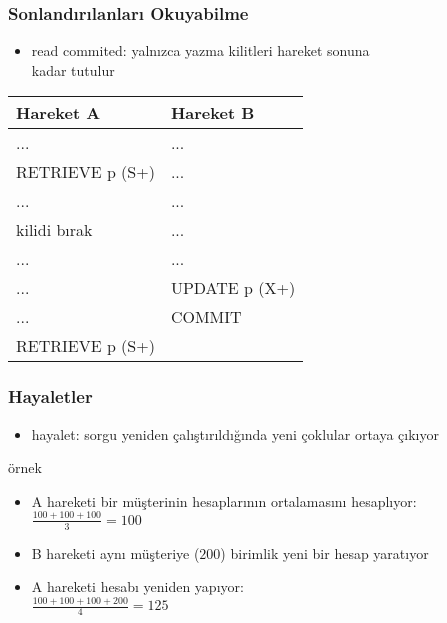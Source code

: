\documentclass[dvipsnames]{beamer}
\theoremstyle{plain}
\begin{document}
\begin{frame}[fragile]
  \frametitle{Sonlandırılanları Okuyabilme}

  \begin{itemize}
    \item read commited: yalnızca yazma kilitleri hareket sonuna\\ 
      kadar tutulur
  \end{itemize}

    \begin{table}
      \begin{tabular}{ll}
Hareket A       & Hareket B    \\\hline
...             & ...          \\\pause
RETRIEVE p (S+) & ...          \\\pause
...             & ...          \\
kilidi bırak    & ...          \\\pause
...             & ...          \\
...             & UPDATE p (X+)\\
...             & COMMIT       \\\pause
RETRIEVE p (S+) &
      \end{tabular}
    \end{table}
\end{frame}

\begin{frame}
  \frametitle{Hayaletler}

  \begin{itemize}
    \item \alert{hayalet}: sorgu yeniden çalıştırıldığında yeni çoklular ortaya çıkıyor
  \end{itemize}

  \pause
  \begin{exampleblock}{örnek}
    \begin{itemize}
      \item A hareketi bir müşterinin hesaplarının ortalamasını hesaplıyor:\\
        \smallskip
        $\frac{100 + 100 + 100}{3}=100$

      \pause
      \item B hareketi aynı müşteriye ($200$) birimlik yeni bir hesap yaratıyor
      \item A hareketi hesabı yeniden yapıyor:\\
        \smallskip
        $\frac{100 + 100 + 100 + 200}{4}=125$
    \end{itemize}
  \end{exampleblock}
\end{frame}
\end{document}
